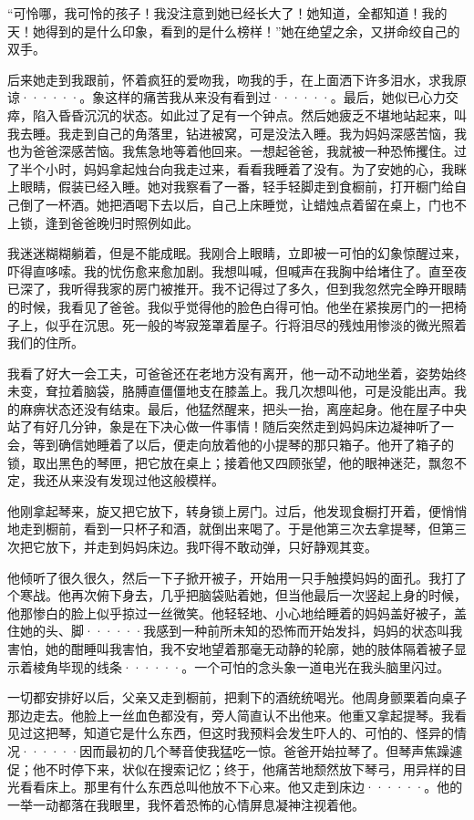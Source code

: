 \documentclass[12pt, UTF8]{ctexbook}
\begin{document}
\par “可怜哪，我可怜的孩子！我没注意到她已经长大了！她知道，全都知道！我的天！她得到的是什么印象，看到的是什么榜样！”她在绝望之余，又拼命绞自己的双手。
\par 后来她走到我跟前，怀着疯狂的爱吻我，吻我的手，在上面洒下许多泪水，求我原谅······。象这样的痛苦我从来没有看到过······。最后，她似已心力交瘁，陷入昏昏沉沉的状态。如此过了足有一个钟点。然后她疲乏不堪地站起来，叫我去睡。我走到自己的角落里，钻进被窝，可是没法入睡。我为妈妈深感苦恼，我也为爸爸深感苦恼。我焦急地等着他回来。一想起爸爸，我就被一种恐怖攫住。过了半个小时，妈妈拿起烛台向我走过来，看看我睡着了没有。为了安她的心，我眯上眼睛，假装已经入睡。她对我察看了一番，轻手轻脚走到食橱前，打开橱门给自己倒了一杯酒。她把酒喝下去以后，自己上床睡觉，让蜡烛点着留在桌上，门也不上锁，逢到爸爸晚归时照例如此。
\par 我迷迷糊糊躺着，但是不能成眠。我刚合上眼睛，立即被一可怕的幻象惊醒过来，吓得直哆嗦。我的忧伤愈来愈加剧。我想叫喊，但喊声在我胸中给堵住了。直至夜已深了，我听得我家的房门被推开。我不记得过了多久，但到我忽然完全睁开眼睛的时候，我看见了爸爸。我似乎觉得他的脸色白得可怕。他坐在紧挨房门的一把椅子上，似乎在沉思。死一般的岑寂笼罩着屋子。行将泪尽的残烛用惨淡的微光照着我们的住所。
\par 我看了好大一会工夫，可爸爸还在老地方没有离开，他一动不动地坐着，姿势始终未变，耷拉着脑袋，胳膊直僵僵地支在膝盖上。我几次想叫他，可是没能出声。我的麻痹状态还没有结束。最后，他猛然醒来，把头一抬，离座起身。他在屋子中央站了有好几分钟，象是在下决心做一件事情！随后突然走到妈妈床边凝神听了一会，等到确信她睡着了以后，便走向放着他的小提琴的那只箱子。他开了箱子的锁，取出黑色的琴匣，把它放在桌上；接着他又四顾张望，他的眼神迷茫，飘忽不定，我还从来没有发现过他这般模样。
\par 他刚拿起琴来，旋又把它放下，转身锁上房门。过后，他发现食橱打开着，便悄悄地走到橱前，看到一只杯子和酒，就倒出来喝了。于是他第三次去拿提琴，但第三次把它放下，并走到妈妈床边。我吓得不敢动弹，只好静观其变。
\par 他倾听了很久很久，然后一下子掀开被子，开始用一只手触摸妈妈的面孔。我打了个寒战。他再次俯下身去，几乎把脑袋贴着她，但当他最后一次竖起上身的时候，他那惨白的脸上似乎掠过一丝微笑。他轻轻地、小心地给睡着的妈妈盖好被子，盖住她的头、脚······我感到一种前所未知的恐怖而开始发抖，妈妈的状态叫我害怕，她的酣睡叫我害怕，我不安地望着那毫无动静的轮廓，她的肢体隔着被子显示着棱角毕现的线条······。一个可怕的念头象一道电光在我头脑里闪过。
\par 一切都安排好以后，父亲又走到橱前，把剩下的酒统统喝光。他周身颤栗着向桌子那边走去。他脸上一丝血色都没有，旁人简直认不出他来。他重又拿起提琴。我看见过这把琴，知道它是什么东西，但这时我预料会发生吓人的、可怕的、怪异的情况······因而最初的几个琴音使我猛吃一惊。爸爸开始拉琴了。但琴声焦躁遽促；他不时停下来，状似在搜索记忆；终于，他痛苦地颓然放下琴弓，用异样的目光看看床上。那里有什么东西总叫他放不下心来。他又走到床边······。他的一举一动都落在我眼里，我怀着恐怖的心情屏息凝神注视着他。
\end{document}

